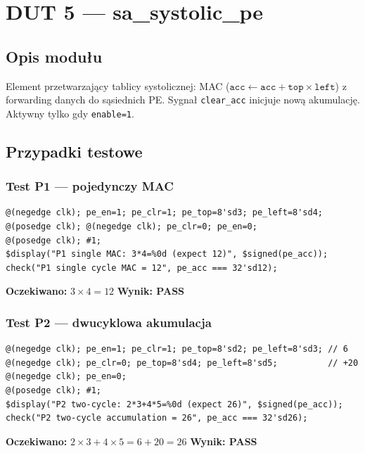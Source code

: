 \documentclass[12pt,a4paper]{article}
\begin{document}
\section{DUT 5 — sa\_systolic\_pe}

\subsection{Opis modułu}

Element przetwarzający tablicy systolicznej: MAC ($\texttt{acc} \leftarrow \texttt{acc} + \texttt{top} \times \texttt{left}$) z forwarding danych do sąsiednich PE. Sygnał \texttt{clear\_acc} inicjuje nową akumulację. Aktywny tylko gdy \texttt{enable=1}.

\subsection{Przypadki testowe}

\subsubsection*{Test P1 — pojedynczy MAC}

\begin{lstlisting}
@(negedge clk); pe_en=1; pe_clr=1; pe_top=8'sd3; pe_left=8'sd4;
@(posedge clk); @(negedge clk); pe_clr=0; pe_en=0;
@(posedge clk); #1;
$display("P1 single MAC: 3*4=%0d (expect 12)", $signed(pe_acc));
check("P1 single cycle MAC = 12", pe_acc === 32'sd12);
\end{lstlisting}

\textbf{Oczekiwano:} $3 \times 4 = 12$ \quad \textbf{Wynik: PASS}

\subsubsection*{Test P2 — dwucyklowa akumulacja}

\begin{lstlisting}
@(negedge clk); pe_en=1; pe_clr=1; pe_top=8'sd2; pe_left=8'sd3; // 6
@(negedge clk); pe_clr=0; pe_top=8'sd4; pe_left=8'sd5;          // +20
@(negedge clk); pe_en=0;
@(posedge clk); #1;
$display("P2 two-cycle: 2*3+4*5=%0d (expect 26)", $signed(pe_acc));
check("P2 two-cycle accumulation = 26", pe_acc === 32'sd26);
\end{lstlisting}

\textbf{Oczekiwano:} $2 \times 3 + 4 \times 5 = 6 + 20 = 26$ \quad \textbf{Wynik: PASS}
\end{document}
